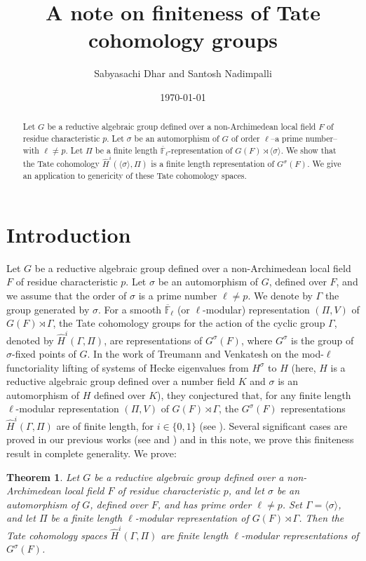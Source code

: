 \documentclass[10pt, reqno]{amsart}
\title{A note on finiteness of Tate cohomology groups}
\author{Sabyasachi Dhar and Santosh Nadimpalli}
\date{\today}
\theoremstyle{plain}
\numberwithin{equation}{section}
\newtheorem{theorem}{Theorem}[section]
\begin{document}
\begin{abstract}
    Let $G$ be a reductive algebraic group defined over a non-Archimedean local
    field $F$ of residue characteristic $p$. Let 
    $\sigma$ be an automorphism of $G$ of order $\ell$--a prime number--with
    $\ell\neq p$. Let $\Pi$ be a finite length 
    $\overline{\mathbb{F}}_\ell$-representation of 
    $G(F)\rtimes \langle\sigma\rangle$. We show that the Tate 
    cohomology $\widehat{H}^i(\langle\sigma\rangle, \Pi)$
    is a finite length representation of  $G^\sigma(F)$. We give an
    application to genericity of these Tate cohomology spaces. 
\end{abstract}
\maketitle
\section{Introduction}
Let $G$ be a reductive algebraic group defined over a non-Archimedean
local field $F$ of residue characteristic $p$. Let $\sigma$ be an
automorphism of $G$, defined over $F$, and we assume that the order of
$\sigma$ is a prime number $\ell\neq p$. We denote by $\Gamma$ the
group generated by $\sigma$. For a smooth $\overline{\mathbb{F}}_\ell$
(or $\ell$-modular) representation $(\Pi, V)$ of $G(F)\rtimes \Gamma$,
the Tate cohomology groups for the action of the cyclic group
$\Gamma$, denoted by $\widehat{H}^i(\Gamma, \Pi)$, are representations
of $G^\sigma(F)$, where $G^\sigma$ is the group of $\sigma$-fixed
points of $G$.  In the work of Treumann and Venkatesh \cite{TV_paper}
on the mod-$\ell$ functoriality lifting of systems of Hecke
eigenvalues from $H^\sigma$ to $H$ (here, $H$ is a reductive algebraic
group defined over a number field $K$ and $\sigma$ is an automorphism
of $H$ defined over $K$), they conjectured that, for any finite length
$\ell$-modular representation $(\Pi, V)$ of $G(F)\rtimes \Gamma$, the
$G^\sigma(F)$ representations $\widehat{H}^i(\Gamma, \Pi)$ are of
finite length, for $i\in \{0,1\}$ (see \cite[Conjecture
6.3]{TV_paper}). Several significant cases are proved in our previous
works (see \cite[Proposition 5.5]{Nadimpalli_2024_GLn} and
\cite[Theorem 3.4.1]{dhar2025jacquetmodulestatecohomology}) and in
this note, we prove this finiteness result in complete generality. We
prove:
\begin{theorem}\label{main}
  Let $G$ be a reductive algebraic group defined over a
  non-Archimedean local field $F$ of residue characteristic $p$, and
  let $\sigma$ be an automorphism of $G$, defined over $F$, and has
  prime order $\ell\neq p$. Set $\Gamma=\langle\sigma\rangle$, and let
  $\Pi$ be a finite length $\ell$-modular representation of
  $G(F)\rtimes \Gamma$.  Then the Tate cohomology spaces
  $\widehat{H}^i(\Gamma, \Pi)$ are finite length $\ell$-modular
  representations of $G^\sigma(F)$.
\end{theorem}
\end{document}
